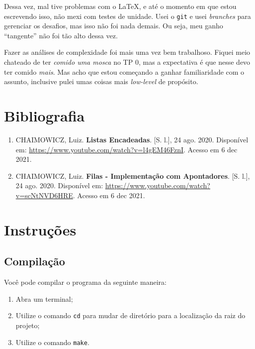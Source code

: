 \documentclass{article}
\def\code#1{\texttt{#1}}
\begin{document}
Dessa vez, mal tive problemas com o \LaTeX, e até o momento em que estou escrevendo isso, não mexi com testes de unidade. Usei o \code{git} e usei \textit{branches} para gerenciar os desafios, mas isso não foi nada demais. Ou seja, meu ganho ``tangente'' não foi tão alto dessa vez.

Fazer as análises de complexidade foi mais uma vez bem trabalhoso. Fiquei meio chateado de ter \textit{comido uma mosca} no TP 0, mas a expectativa é que nesse devo ter comido \textit{mais}. Mas acho que estou começando a ganhar familiaridade com o assunto, inclusive pulei umas coisas mais \textit{low-level} de propósito.


\section{Bibliografia}

\begin{enumerate}

    \item CHAIMOWICZ, Luiz. \textbf{Listas Encadeadas}. [S. l.], 24 ago. 2020. Disponível em: \url{https://www.youtube.com/watch?v=l4gEM46FznI}. Acesso em 6 dec 2021.

    \item CHAIMOWICZ, Luiz. \textbf{Filas - Implementação com Apontadores}. [S. l.], 24 ago. 2020. Disponível em: \url{https://www.youtube.com/watch?v=scNtNVD6HRE}. Acesso em 6 dec 2021.

\end{enumerate}


\newpage
\section*{Instruções}

\subsection*{Compilação}

Você pode compilar o programa da seguinte maneira:

\begin{enumerate}
    \item Abra um terminal;
    \item Utilize o comando \code{cd} para mudar de diretório para a localização da raiz do projeto;
    \item Utilize o comando \code{make}. 
\end{enumerate}
\end{document}
